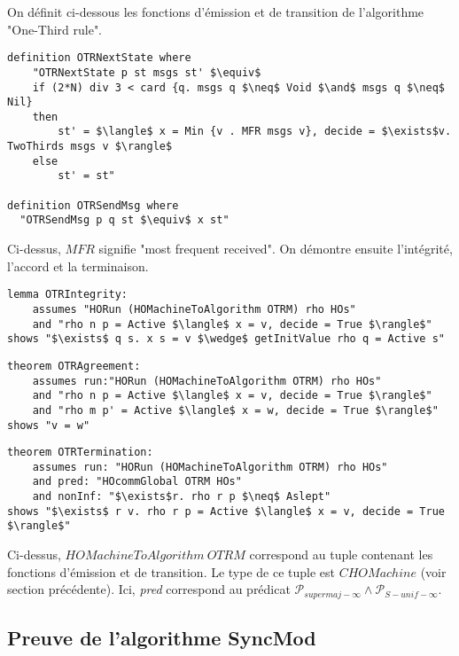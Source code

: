 \documentclass{article}
\begin{document}
On définit ci-dessous les fonctions d'émission et de transition de l'algorithme "One-Third rule".

\begin{lstlisting}[mathescape=true]
definition OTRNextState where
	"OTRNextState p st msgs st' $\equiv$ 
	if (2*N) div 3 < card {q. msgs q $\neq$ Void $\and$ msgs q $\neq$ Nil}
	then
		st' = $\langle$ x = Min {v . MFR msgs v}, decide = $\exists$v. TwoThirds msgs v $\rangle$
	else
		st' = st"

definition OTRSendMsg where
  "OTRSendMsg p q st $\equiv$ x st"
\end{lstlisting}

Ci-dessus, $MFR$ signifie "most frequent received".
On démontre ensuite l'intégrité, l'accord et la terminaison.

\begin{lstlisting}[mathescape=true]
lemma OTRIntegrity:
	assumes "HORun (HOMachineToAlgorithm OTRM) rho HOs" 
	and "rho n p = Active $\langle$ x = v, decide = True $\rangle$"
shows "$\exists$ q s. x s = v $\wedge$ getInitValue rho q = Active s"
\end{lstlisting}

\begin{lstlisting}[mathescape=true]
theorem OTRAgreement:
	assumes run:"HORun (HOMachineToAlgorithm OTRM) rho HOs"
	and "rho n p = Active $\langle$ x = v, decide = True $\rangle$"
	and "rho m p' = Active $\langle$ x = w, decide = True $\rangle$"
shows "v = w"
\end{lstlisting}

\begin{lstlisting}[mathescape=true]
theorem OTRTermination:
	assumes run: "HORun (HOMachineToAlgorithm OTRM) rho HOs" 
	and pred: "HOcommGlobal OTRM HOs"
	and nonInf: "$\exists$r. rho r p $\neq$ Aslept"
shows "$\exists$ r v. rho r p = Active $\langle$ x = v, decide = True $\rangle$"
\end{lstlisting}

Ci-dessus, $HOMachineToAlgorithm~OTRM$ correspond au tuple contenant les fonctions d'émission et de transition. Le type de ce tuple est $CHOMachine$ (voir section précédente).
Ici, \emph{pred} correspond au prédicat $\mathcal{P}_{supermaj-\infty} \wedge \mathcal{P}_{S-unif-\infty}$.

\subsection{Preuve de l'algorithme SyncMod}
\end{document}
